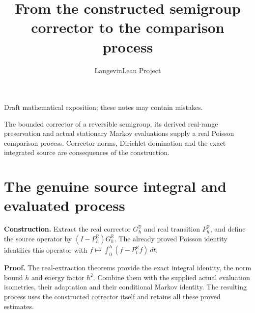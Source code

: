 \documentclass[11pt,a4paper]{article}
\title{\texorpdfstring{From the constructed semigroup corrector to the comparison process}{From the constructed semigroup corrector to the comparison process}}
\author{LangevinLean Project}
\date{}
\begin{document}
\maketitle
Draft mathematical exposition; these notes may contain mistakes.


The bounded corrector of a reversible semigroup, its derived real-range preservation and actual stationary Markov evaluations supply a real Poisson comparison process. Corrector norms, Dirichlet domination and the exact integrated source are consequences of the construction.


\section{\texorpdfstring{The genuine source integral and evaluated process}{The genuine source integral and evaluated process}}


\textbf{Construction.} Extract the real corrector \(G_h^{\mathbb R}\) and real transition \(P_h^{\mathbb R}\), and define the source operator by \((I-P_h^{\mathbb R})G_h^{\mathbb R}\). The already proved Poisson identity identifies this operator with \(f\mapsto\int_0^h(f-P_t^{\mathbb R}f)\,dt\).



\textbf{Proof.} The real-extraction theorems provide the exact integral identity, the norm bound \(h\) and energy factor \(h^2\). Combine them with the supplied actual evaluation isometries, their adaptation and their conditional Markov identity. The resulting process uses the constructed corrector itself and retains all these proved estimates.
\end{document}
